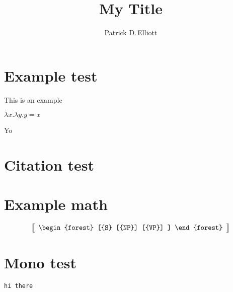 \documentclass{ling-paper}
\title{My Title}
\author{Patrick D.\,Elliott}
\begin{document}
\maketitle

\section{Example test}

\ex
This is an example
\xe

\ex
\(λ x . λ y . y = x\)
\xe

Yo

\section{Citation test}

\cite{heim_presupposition_1992}

\section{Example math}

\[
\left\llbracket
\begin{array}{c}
\begin{forest}
[{S}
  [{NP}]
  [{VP}]
]
\end{forest}
\end{array}
\right\rrbracket
\]

\section{Mono test}

\texttt{hi there}

\printbibliography
\end{document}
